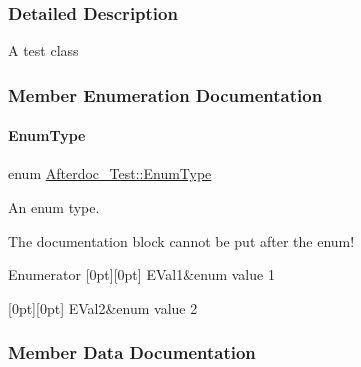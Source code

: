 \subsubsection{Detailed Description}
A test class 

\subsubsection{Member Enumeration Documentation}
\mbox{\label{class_afterdoc___test_adab0cd7ad3b4875e245ca8f6238a388a}} 
\paragraph{\texorpdfstring{EnumType}{EnumType}}
{\footnotesize\ttfamily enum \mbox{\hyperlink{class_afterdoc___test_adab0cd7ad3b4875e245ca8f6238a388a}{Afterdoc\+\_\+\+Test\+::\+Enum\+Type}}}



An enum type. 

The documentation block cannot be put after the enum! \begin{DoxyEnumFields}{Enumerator}
[0pt][0pt]{}\mbox{\label{class_afterdoc___test_adab0cd7ad3b4875e245ca8f6238a388aae054276790e35692ad0abe10c5b75da4}} 
E\+Val1&enum value 1 \\
\hline

[0pt][0pt]{}\mbox{\label{class_afterdoc___test_adab0cd7ad3b4875e245ca8f6238a388aac849f37624d8d2d68ca72c4a8df9cf99}} 
E\+Val2&enum value 2 \\
\hline

\end{DoxyEnumFields}


\subsubsection{Member Data Documentation}
\mbox{\label{class_afterdoc___test_a9287a08830e5cdfd9c732bb7932694a0}} 
